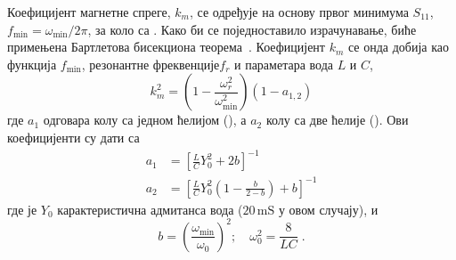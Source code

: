 \documentclass[main.tex]{subfiles}
\begin{document}
Коефицијент магнетне спреге, $k_m$, се одређује на основу првог минимума $S_{11}$, $f_\text{min}=\omega_\text{min}/2\pi$,  за коло са . Како би се поједноставило израчунавање, биће примењена Бартлетова бисекциона теорема~\cite{bib20}. Коефицијент $k_m$ се онда добија као функција $f_\text{min}$, резонантне фреквенције$f_r$ и параметара вода $L$ и $C$,
\begin{equation}
k_m^2 = \left( 1 - \frac{\omega_r^2}{\omega_\text{min}^2} \right) \left( 1 - a_{1,2} \right) 
\end{equation}
где $a_1$ одговара колу са једном ћелијом (), а $a_2$ колу са две ћелије (). Ови коефицијенти су дати са
\begin{align}
a_1 & = \left[ \frac{L}{C}Y_0^2 + 2b \right]^{-1} \\
a_2 & = \left[ \frac{L}{C}Y_0^2 \left( 1 - \frac{b}{2-b} \right) + b \right]^{-1} 
\end{align}
где је $Y_0$ карактеристична адмитанса вода ($20\,\mathrm{mS}$ у овом случају), и 
\begin{equation*}
b  = \left( \frac{\omega_\text{min}}{\omega_0} \right)^2;\quad
\omega_0^2=\frac{8}{LC}\;.
\end{equation*}
\end{document}

